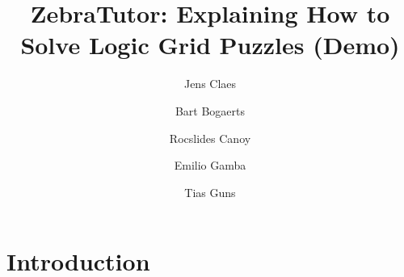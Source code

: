 \documentclass[runningheads]{llncs}
\newcommand{\zebratutor}{ZebraTutor\xspace}
\newcommand{\ourtool}{\zebratutor}
\newcommand{\idp}{IDP\xspace}
\begin{document}
%
\title{\zebratutor: Explaining How to Solve Logic Grid Puzzles (Demo)}
%
%
\author{Jens Claes \and
Bart Bogaerts \and
Rocslides Canoy \and 
Emilio Gamba \and 
Tias Guns }
%
%
%
\maketitle              %
%
% 
%
%
%
\section{Introduction}
% 
\end{document}
